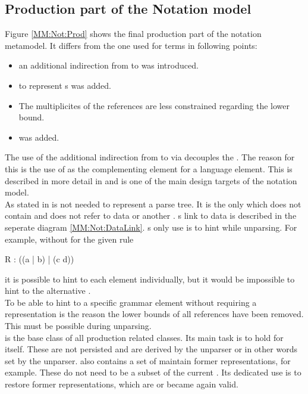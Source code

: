 \subsection{Production part of the Notation model}
Figure \ref{MM:Not:Prod} shows the final production part of the notation metamodel. It differs from the one used for terms in following points:
\begin{itemize}
	\item an additional indirection from  to  was introduced. 
	\item {} to represent s was added.
	\item The multiplicites of the references are less constrained regarding the lower bound.
	\item {} was added.
\end{itemize}
The use of the additional indirection from  to  via  decouples the . The reason for this is the use of  as the complementing element for a language element. This is described in more detail in  and is one of the main design targets of the notation model.\\
As stated in   is not needed to represent a parse tree. It is the only  which does not contain and does not refer to data or another . s link to data is described in the seperate diagram \ref{MM:Not:DataLink}. s only use is to hint while unparsing. For example, without  for the given rule
\begin{xtxt}
R : ((a | b) | (c d)) 
\end{xtxt}
it is possible to hint to each element individually, but it would be impossible to hint to the alternative . \\
To be able to hint to a specific grammar element without requiring a representation is the reason the lower bounds of all references have been removed. This must be possible during unparsing.\\
 is the base class of all production related classes. Its main task is to hold  for itself. These  are not persisted and are derived by the unparser or in other words set by the unparser.  also contains a set of  maintain former representations, for example. These do not need to be a subset of the current . Its dedicated use is to restore former representations, which are or became again valid.

